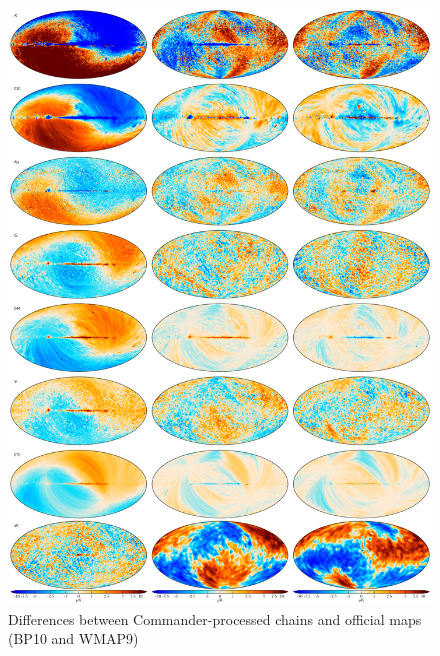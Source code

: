 \documentclass[twocolumn]{../../common/aa}
\begin{document}
\begin{figure}
	\centering
	\includegraphics[width=0.93\linewidth]{figures/megadiff.pdf}
	\caption{Differences between Commander-processed chains and official maps (BP10 and WMAP9)}
\end{figure}








%




\end{document}
